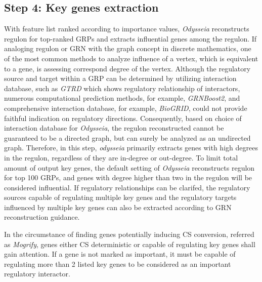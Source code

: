 \documentclass[fleqn,10pt]{wlscirep}
\begin{document}
\subsection*{Step 4: Key genes extraction}
\label{step4}
With feature list ranked according to importance values, \emph{Odysseia} reconstructs regulon for top-ranked GRPs and extracts influential genes among the regulon.
If analoging regulon or GRN with the graph concept in discrete mathematics, one of the most common methods to analyze influence of a vertex, which is equivalent to a gene, is assessing correspond degree of the vertex.
Although the regulatory source and target within a GRP can be determined by utilizing interaction database, such as \emph{GTRD}\cite{gkaa1057} which shows regulatory relationship of interactors, numerous computational prediction methods, for example,  \emph{GRNBoost2}\cite{grnboost2}, and comprehensive interaction database, for example, \emph{BioGRID}\cite{biogrid}, could not provide faithful indication on regulatory directions.
Consequently, based on choice of interaction database for \emph{Odysseia}, the regulon reconstructed cannot be guaranteed to be a directed graph, but can surely be analyzed as an undirected graph.
Therefore, in this step, \emph{odysseia} primarily extracts genes with high degrees in the regulon, regardless of they are in-degree or out-degree.
To limit total amount of output key genes, the default setting of \emph{Odysseia} reconstructs regulon for top 100 GRPs, and genes with degree higher than two in the regulon will be considered influential.
If regulatory relationships can be clarifed, the regulatory sources capable of regulating multiple key genes and the regulatory targets influenced by multiple key genes can also be extracted according to GRN reconstruction guidance.

In the circumstance of finding genes potentially inducing CS conversion, referred as \emph{Mogrify}\cite{mogrify_2016}, genes either CS deterministic or capable of regulating key genes shall gain attention.
If a gene is not marked as important, it must be capable of regulating more than 2 listed key genes to be considered as an important regulatory interactor.
\end{document}
